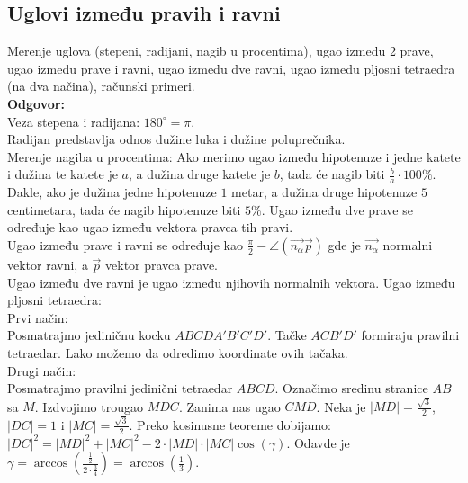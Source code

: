 \documentclass[12pt]{article}
\begin{document}
    \subsection{Uglovi između pravih i ravni}
    Merenje uglova (stepeni, radijani, nagib u procentima),
    ugao između 2 prave, ugao između prave i ravni,
    ugao između dve ravni, ugao između pljosni tetraedra
    (na dva načina), računski primeri.\\
    \textbf{Odgovor:}\\
    Veza stepena i radijana: $180^\circ=\pi$.\\
    Radijan predstavlja odnos dužine luka i dužine poluprečnika.\\
    Merenje nagiba u procentima: Ako merimo ugao između hipotenuze
    i jedne katete i dužina te katete je $a$, a dužina druge
    katete je $b$, tada će nagib biti $\frac{b}{a}\cdot 100\%$. Dakle,
    ako je dužina jedne hipotenuze $1$ metar, a dužina druge
    hipotenuze $5$ centimetara, tada će nagib hipotenuze biti $5\%$.
    Ugao između dve prave se određuje kao ugao između vektora pravca
    tih pravi.\\
    Ugao između prave i ravni se određuje kao $\frac{\pi}{2}-\angle(\overrightarrow{n_\alpha}\overrightarrow{p})$
    gde je $\overrightarrow{n_\alpha}$ normalni vektor ravni, a $\overrightarrow{p}$ vektor pravca prave.\\
    Ugao između dve ravni je ugao između njihovih normalnih vektora.
    Ugao između pljosni tetraedra:\\
    Prvi način:\\
    Posmatrajmo jediničnu kocku $ABCDA'B'C'D'$.
    Tačke $ACB'D'$ formiraju pravilni tetraedar. Lako možemo
    da odredimo koordinate ovih tačaka.\\
    Drugi način:\\
    Posmatrajmo pravilni jedinični tetraedar $ABCD$. Označimo sredinu
    stranice $AB$ sa $M$. Izdvojimo trougao $MDC$. Zanima nas
    ugao $CMD$. Neka je $|MD|=\frac{\sqrt{3}}{2}$, $|DC|=1$ i $|MC|=\frac{\sqrt{3}}{2}$.
    Preko kosinusne teoreme dobijamo:\\
$|DC|^2=|MD|^2+|MC|^2-2\cdot|MD|\cdot|MC|\cos(\gamma)$.
    Odavde je $\gamma=\arccos(\frac{\frac{1}{2}}{2\cdot\frac{3}{4}})=\arccos(\frac{1}{3})$.
    \par
\end{document}
